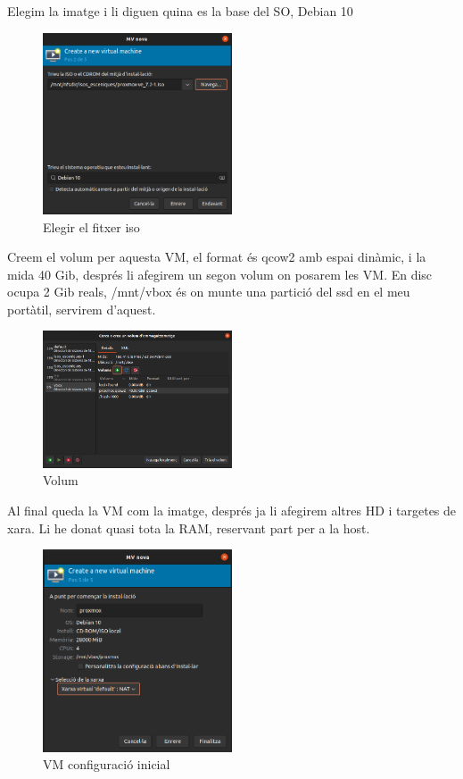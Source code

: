 \documentclass[
  10pt,
]{krantz}
\begin{document}
Elegim la imatge i li diguen quina es la base del SO, Debian 10

\begin{figure}
\centering
\includegraphics[width=0.5\textwidth,height=\textheight]{imatges/proxmox/proxmox_install2.png}
\caption{Elegir el fitxer iso}
\end{figure}

Creem el volum per aquesta VM, el format és qcow2 amb espai dinàmic, i la mida 40 Gib, després li afegirem un segon volum on posarem les VM. En disc ocupa 2 Gib reals, /mnt/vbox és on munte una partició del ssd en el meu portàtil, servirem d'aquest.

\begin{figure}
\centering
\includegraphics[width=0.5\textwidth,height=\textheight]{imatges/proxmox/proxmox_inst5.png}
\caption{Volum}
\end{figure}

Al final queda la VM com la imatge, després ja li afegirem altres HD i targetes de xara. Li he donat quasi tota la RAM, reservant part per a la host.

\begin{figure}
\centering
\includegraphics[width=0.5\textwidth,height=\textheight]{imatges/proxmox/proxmox_inst4.png}
\caption{VM configuració inicial}
\end{figure}
\end{document}
